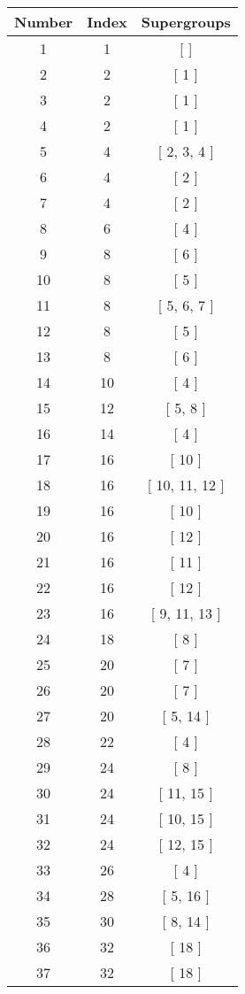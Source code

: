 \begin{center}
\begin{longtable}[H]{|| c c c ||}
\hline
Number &  Index &  Supergroups
\\\hline
1 & 1 & [  ]
\\\hline
2 & 2 & [ 1 ]
\\\hline
3 & 2 & [ 1 ]
\\\hline
4 & 2 & [ 1 ]
\\\hline
5 & 4 & [ 2, 3, 4 ]
\\\hline
6 & 4 & [ 2 ]
\\\hline
7 & 4 & [ 2 ]
\\\hline
8 & 6 & [ 4 ]
\\\hline
9 & 8 & [ 6 ]
\\\hline
10 & 8 & [ 5 ]
\\\hline
11 & 8 & [ 5, 6, 7 ]
\\\hline
12 & 8 & [ 5 ]
\\\hline
13 & 8 & [ 6 ]
\\\hline
14 & 10 & [ 4 ]
\\\hline
15 & 12 & [ 5, 8 ]
\\\hline
16 & 14 & [ 4 ]
\\\hline
17 & 16 & [ 10 ]
\\\hline
18 & 16 & [ 10, 11, 12 ]
\\\hline
19 & 16 & [ 10 ]
\\\hline
20 & 16 & [ 12 ]
\\\hline
21 & 16 & [ 11 ]
\\\hline
22 & 16 & [ 12 ]
\\\hline
23 & 16 & [ 9, 11, 13 ]
\\\hline
24 & 18 & [ 8 ]
\\\hline
25 & 20 & [ 7 ]
\\\hline
26 & 20 & [ 7 ]
\\\hline
27 & 20 & [ 5, 14 ]
\\\hline
28 & 22 & [ 4 ]
\\\hline
29 & 24 & [ 8 ]
\\\hline
30 & 24 & [ 11, 15 ]
\\\hline
31 & 24 & [ 10, 15 ]
\\\hline
32 & 24 & [ 12, 15 ]
\\\hline
33 & 26 & [ 4 ]
\\\hline
34 & 28 & [ 5, 16 ]
\\\hline
35 & 30 & [ 8, 14 ]
\\\hline
36 & 32 & [ 18 ]
\\\hline
37 & 32 & [ 18 ]

\end{longtable}
\end{center}
